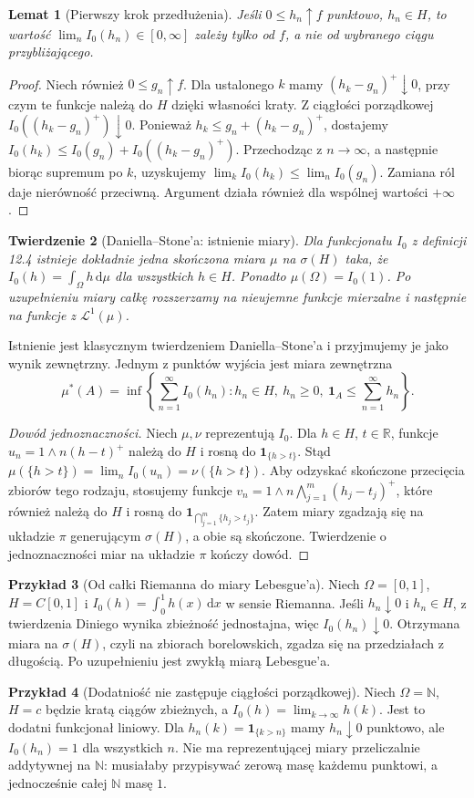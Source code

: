 \documentclass[11pt,a4paper]{article}
\numberwithin{equation}{section}
\theoremstyle{plain}
\newtheorem{twierdzenie}{Twierdzenie}[section]
\newtheorem{lemat}[twierdzenie]{Lemat}
\theoremstyle{definition}
\newtheorem{przyklad}[twierdzenie]{Przykład}
\theoremstyle{remark}
\newcommand{\R}{\mathbb R}
\newcommand{\N}{\mathbb N}
\newcommand{\ind}[1]{\mathbf 1_{#1}}
\begin{document}
\begin{lemat}[Pierwszy krok przedłużenia]
Jeśli $0\le h_n\uparrow f$ punktowo, $h_n\in H$, to wartość $\lim_n I_0(h_n)\in[0,\infty]$ zależy tylko od $f$, a nie od wybranego ciągu przybliżającego.
\end{lemat}
\begin{proof}
Niech również $0\le g_n\uparrow f$. Dla ustalonego $k$ mamy $(h_k-g_n)^+\downarrow0$, przy czym te funkcje należą do $H$ dzięki własności kraty. Z ciągłości porządkowej $I_0((h_k-g_n)^+)\downarrow0$. Ponieważ $h_k\le g_n+(h_k-g_n)^+$, dostajemy $I_0(h_k)\le I_0(g_n)+I_0((h_k-g_n)^+)$. Przechodząc z $n\to\infty$, a następnie biorąc supremum po $k$, uzyskujemy $\lim_kI_0(h_k)\le\lim_nI_0(g_n)$. Zamiana ról daje nierówność przeciwną. Argument działa również dla wspólnej wartości $+\infty$.
\end{proof}
\begin{twierdzenie}[Daniella--Stone'a: istnienie miary]
Dla funkcjonału $I_0$ z definicji 12.4 istnieje dokładnie jedna skończona miara $\mu$ na $\sigma(H)$ taka, że $I_0(h)=\int_\Omega h\,\mathrm d\mu$ dla wszystkich $h\in H$. Ponadto $\mu(\Omega)=I_0(1)$. Po uzupełnieniu miary całkę rozszerzamy na nieujemne funkcje mierzalne i następnie na funkcje z $\mathcal L^1(\mu)$.
\end{twierdzenie}
Istnienie jest klasycznym twierdzeniem Daniella--Stone'a i przyjmujemy je jako wynik zewnętrzny. Jednym z punktów wyjścia jest miara zewnętrzna
\[
\mu^*(A)=\inf\left\{\sum_{n=1}^\infty I_0(h_n):h_n\in H,\ h_n\ge0,\ \ind A\le\sum_{n=1}^\infty h_n\right\}.
\]
\begin{proof}[Dowód jednoznaczności]
Niech $\mu,\nu$ reprezentują $I_0$. Dla $h\in H$, $t\in\R$, funkcje $u_n=1\wedge n(h-t)^+$ należą do $H$ i rosną do $\ind{\{h>t\}}$. Stąd $\mu(\{h>t\})=\lim_nI_0(u_n)=\nu(\{h>t\})$. Aby odzyskać skończone przecięcia zbiorów tego rodzaju, stosujemy funkcje $v_n=1\wedge n\bigwedge_{j=1}^m(h_j-t_j)^+$, które również należą do $H$ i rosną do $\ind{\bigcap_{j=1}^m\{h_j>t_j\}}$. Zatem miary zgadzają się na układzie $\pi$ generującym $\sigma(H)$, a obie są skończone. Twierdzenie o jednoznaczności miar na układzie $\pi$ kończy dowód.
\end{proof}
\begin{przyklad}[Od całki Riemanna do miary Lebesgue'a]
Niech $\Omega=[0,1]$, $H=C[0,1]$ i $I_0(h)=\int_0^1h(x)\,\mathrm dx$ w sensie Riemanna. Jeśli $h_n\downarrow0$ i $h_n\in H$, z twierdzenia Diniego wynika zbieżność jednostajna, więc $I_0(h_n)\downarrow0$. Otrzymana miara na $\sigma(H)$, czyli na zbiorach borelowskich, zgadza się na przedziałach z długością. Po uzupełnieniu jest zwykłą miarą Lebesgue'a.
\end{przyklad}
\begin{przyklad}[Dodatniość nie zastępuje ciągłości porządkowej]
Niech $\Omega=\N$, $H=c$ będzie kratą ciągów zbieżnych, a $I_0(h)=\lim_{k\to\infty}h(k)$. Jest to dodatni funkcjonał liniowy. Dla $h_n(k)=\ind{\{k>n\}}$ mamy $h_n\downarrow0$ punktowo, ale $I_0(h_n)=1$ dla wszystkich $n$. Nie ma reprezentującej miary przeliczalnie addytywnej na $\N$: musiałaby przypisywać zerową masę każdemu punktowi, a jednocześnie całej $\N$ masę $1$.
\end{przyklad}
\end{document}
